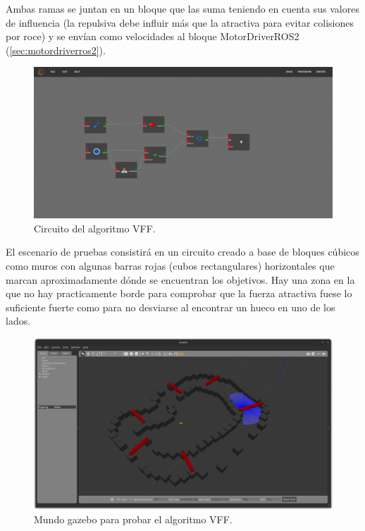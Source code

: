 Ambas ramas se juntan en un bloque que las suma teniendo en cuenta sus valores de influencia (la repulsiva debe influir más que la atractiva para evitar colisiones por
roce) y se envían como velocidades al bloque MotorDriverROS2 (\ref{sec:motordriverros2}).
\begin{figure} [H]
    \begin{center}
        \includegraphics[width=12cm]{figs/c6/VFF_circ.png}
    \end{center}
    \caption[Circuito VFF]{Circuito del algoritmo VFF.}
    \label{fig:VFF_circ}
\end{figure}
El escenario de pruebas consistirá en un circuito creado a base de bloques cúbicos como muros con algunas barras rojas (cubos rectangulares) horizontales que marcan
aproximadamente dónde se encuentran los objetivos. Hay una zona en la que no hay practicamente borde para comprobar que la fuerza atractiva fuese lo suficiente fuerte
como para no desviarse al encontrar un hueco en uno de los lados.

\begin{figure} [H]
    \begin{center}
        \includegraphics[width=12cm]{figs/c6/VFF_world.png}
    \end{center}
    \caption[Mundo para VFF]{Mundo gazebo para probar el algoritmo VFF.}
    \label{fig:VFF_world}
\end{figure}

